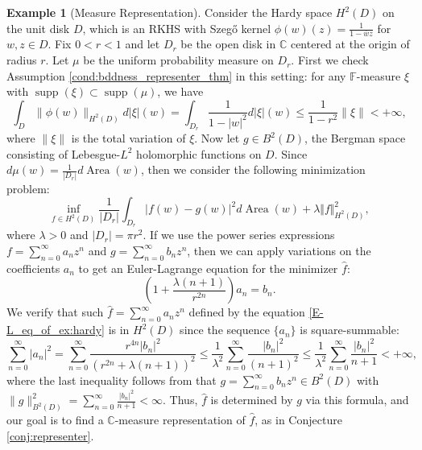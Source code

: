 \documentclass{amsart}
\numberwithin{equation}{section}
\DeclareMathOperator{\supp}{supp}
\DeclareMathOperator{\Area}{Area}
\theoremstyle{plain}
\theoremstyle{remark}
\theoremstyle{definition}
\newtheorem{example}[subsection]{Example}
\begin{document}
\begin{example}[Measure Representation]\label{ex:hardy}
Consider the Hardy space $H^2(D)$ on the unit disk $D$, which is an RKHS with Szegő kernel $\phi(w)(z) = \frac{1}{1 - \overline{w} z}$ for $w, z \in D$.
Fix $0<r<1$ and let $D_r$ be the open disk in $\mathbb{C}$ centered at the origin of radius $r$.
Let $\mu$ be the uniform probability measure on $D_r$.
First we check Assumption \ref{cond:bddness_representer_thm} in this setting: for any $\mathbb{F}$-measure $\xi$ with $\supp (\xi) \subset \supp (\mu)$, we have
\begin{equation*}
    \int_D \|\phi(w)\|_{H^2(D)}d|\xi|(w)=\int_{D_r} \frac{1}{1-|w|^2}d|\xi|(w)\leq \frac{1}{1-r^2}\|\xi\|<+\infty,
\end{equation*}
where $\|\xi\|$ is the total variation of $\xi$.
Now let $g \in B^2(D)$, the Bergman space consisting of Lebesgue-$L^2$ holomorphic functions on $D$. Since $d\mu(w) = \frac{1}{|D_r|}d\Area(w)$, then we consider the following minimization problem:
    \begin{equation*}
   \underset{f \in H^2(D)}{\inf} \frac{1}{|D_r|} \int_{D_r} |f(w)-g(w)|^2  d\Area(w) + \lambda \Vert f \Vert^2_{H^2(D)},
\end{equation*}
where $\lambda>0$ and $|D_r| = \pi r^2$.
If we use the power series expressions $f=\sum_{n=0}^\infty a_n z^n$ and $g=\sum_{n=0}^\infty b_nz^n$, then we can apply variations on the coefficients $a_n$ to get an Euler-Lagrange equation for the minimizer $\hat{f}$:
\begin{equation}\label{E-L_eq_of_ex:hardy}
    \left(1+\frac{\lambda(n+1)}{r^{2n}}\right)a_n=b_n.
\end{equation}
We verify that such $\hat{f}=\sum_{n=0}^\infty a_n z^n$ defined by the equation \eqref{E-L_eq_of_ex:hardy} is in $H^2(D)$ since the sequence $\{a_n\}$ is square-summable:
\begin{equation*}
    \sum_{n=0}^\infty |a_n|^2 = \sum_{n=0}^\infty \frac{r^{4n}|b_n|^2}{(r^{2n}+\lambda(n+1))^2} \leq \frac{1}{\lambda^2} \sum_{n=0}^\infty \frac{|b_n|^2}{(n+1)^2} \leq \frac{1}{\lambda^2} \sum_{n=0}^\infty \frac{|b_n|^2}{n+1} <+\infty,
\end{equation*}
where the last inequality follows from that $g=\sum_{n=0}^\infty b_nz^n \in B^2(D)$ with $\|g\|_{B^2(D)}^2 =\sum_{n=0}^\infty \frac{|b_n|^2}{n+1} <\infty$.
Thus, $\hat{f}$ is determined by $g$ via this formula, and our goal is to find a $\mathbb{C}$-measure representation of $\hat{f}$, as in Conjecture \ref{conj:representer}.
\par

\end{example}
\end{document}
